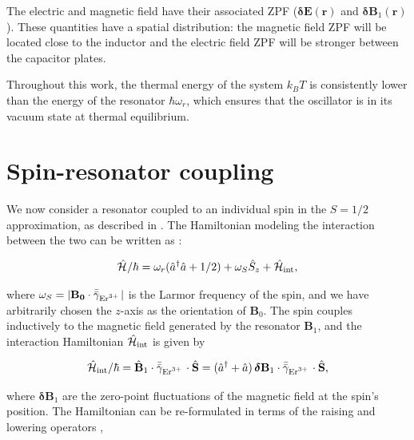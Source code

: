 The electric and magnetic field have their associated ZPF ($\boldsymbol{\delta}\mathbf{E}(\mathbf{r})$ and $\boldsymbol{\delta}\mathbf{B}_1(\mathbf{r})$). These quantities have a spatial distribution: the magnetic field ZPF will be located close to the inductor and the electric field ZPF will be stronger between the capacitor plates.


Throughout this work, the thermal energy of the system $k_B T$ is consistently lower than the energy of the resonator $\hbar \omega_r$, which ensures that the oscillator is in its vacuum state at thermal equilibrium. 

\section{Spin-resonator coupling}

We now consider a resonator coupled to an individual \Er spin in the $S=1/2$ approximation, as described in . The Hamiltonian modeling the interaction between the two can be written as :


\begin{align}
    \hat{\mathcal{H}}_{\text{}} / \hbar = \omega_r(\hat{a}^\dagger \hat{a} + 1/2) +  \omega_S \hat{S}_z + \hat{\mathcal{H}}_{\text{int}},
\end{align}

\noindent where $\omega_S = | \mathbf{B_0} \cdot \bar{\bar{\gamma}}_{\text{Er$^{3+}$\,}} | $ is the Larmor frequency of the spin, and we have arbitrarily chosen the $z$-axis as the orientation of $\mathbf{B}_0$. The spin couples inductively to the magnetic field generated by the resonator $\mathbf{B}_1$, and the interaction Hamiltonian $\hat{\mathcal{H}}_{\text{int}}$ is given by

\begin{equation}
    \hat{\mathcal{H}}_{\text{int}} / \hbar = \hat{\mathbf{B}}_1 \cdot \bar{\bar{\gamma}}_{\text{Er$^{3+}$\,}} \cdot \hat{\mathbf{S}} = (\hat{a}^\dagger + \hat{a}) \, \boldsymbol{\delta}\mathbf{B}_1 \cdot \bar{\bar{\gamma}}_{\text{Er$^{3+}$\,}} \cdot \hat{\mathbf{S}},
\end{equation}

\noindent where $\boldsymbol{\delta}\mathbf{B}_1$ are the zero-point fluctuations of the magnetic field at the \Er spin's position. The Hamiltonian can be re-formulated in terms of the raising and lowering operators ,


